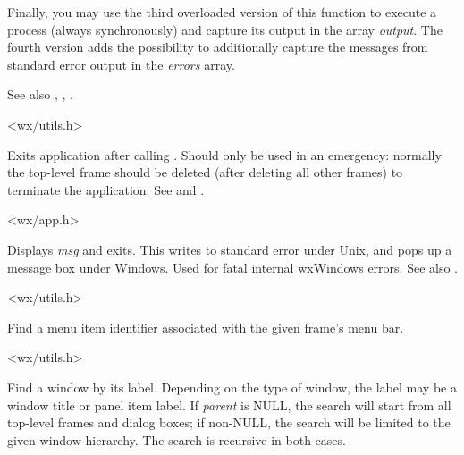 Finally, you may use the third overloaded version of this function to execute
a process (always synchronously) and capture its output in the array
{\it output}. The fourth version adds the possibility to additionally capture
the messages from standard error output in the {\it errors} array.

See also , ,
.


<wx/utils.h>

\label{wxexit}


Exits application after calling .
Should only be used in an emergency: normally the top-level frame
should be deleted (after deleting all other frames) to terminate the
application. See  and .


<wx/app.h>

\label{wxfatalerror}


Displays {\it msg} and exits. This writes to standard error under Unix,
and pops up a message box under Windows. Used for fatal internal
wxWindows errors. See also .


<wx/utils.h>



Find a menu item identifier associated with the given frame's menu bar.


<wx/utils.h>

\label{wxfindwindowbylabel}


Find a window by its label. Depending on the type of window, the label may be a window title
or panel item label. If {\it parent} is NULL, the search will start from all top-level
frames and dialog boxes; if non-NULL, the search will be limited to the given window hierarchy.
The search is recursive in both cases.

